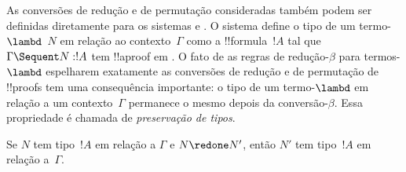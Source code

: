 \documentclass[../../../include/open-logic-section]{subfiles}
\begin{document}


As conversões de redução e de permutação consideradas também podem ser
definidas diretamente para os sistemas  e . O
sistema  define o tipo de um termo-$\lambd$~$N$ em relação ao
contexto~$\Gamma$ como a !!{formula}~$!A$ tal que
$\Gamma \Sequent N : !A$ tem !!a{proof} em . O fato de as
regras de redução-$\beta$ para termos-$\lambd$ espelharem exatamente as
conversões de redução e de permutação de !!{proof}s tem uma consequência
importante: o tipo de um termo-$\lambd$ em relação a um contexto~$\Gamma$
permanece o mesmo depois da conversão-$\beta$. Essa propriedade é
chamada de \emph{preservação de tipos}.

\begin{prop}
Se $N$ tem tipo~$!A$ em relação a $\Gamma$ e $N \redone N'$, então
$N'$ tem tipo~$!A$ em relação a~$\Gamma$.
\end{prop}
\end{document}
